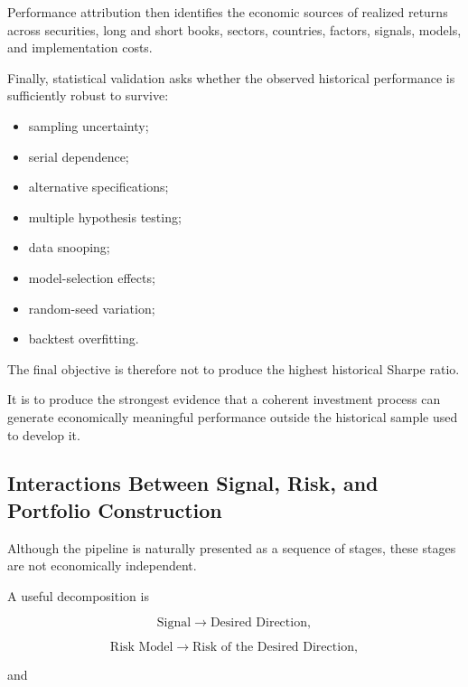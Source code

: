 \documentclass[11pt,a4paper]{article}
\begin{document}
Performance attribution then identifies the economic sources of realized
returns across securities, long and short books, sectors, countries, factors,
signals, models, and implementation costs.

Finally, statistical validation asks whether the observed historical performance
is sufficiently robust to survive:

\begin{itemize}
    \item sampling uncertainty;
    \item serial dependence;
    \item alternative specifications;
    \item multiple hypothesis testing;
    \item data snooping;
    \item model-selection effects;
    \item random-seed variation;
    \item backtest overfitting.
\end{itemize}

The final objective is therefore not to produce the highest historical Sharpe
ratio.

It is to produce the strongest evidence that a coherent investment process can
generate economically meaningful performance outside the historical sample
used to develop it.


\subsection{Interactions Between Signal, Risk, and Portfolio Construction}
\label{subsec:interactions_signal_risk_portfolio}

Although the pipeline is naturally presented as a sequence of stages, these
stages are not economically independent.

A useful decomposition is

\begin{equation}
\boxed{
\text{Signal}
\rightarrow
\text{Desired Direction},
}
\end{equation}

\begin{equation}
\boxed{
\text{Risk Model}
\rightarrow
\text{Risk of the Desired Direction},
}
\end{equation}

and
\end{document}
